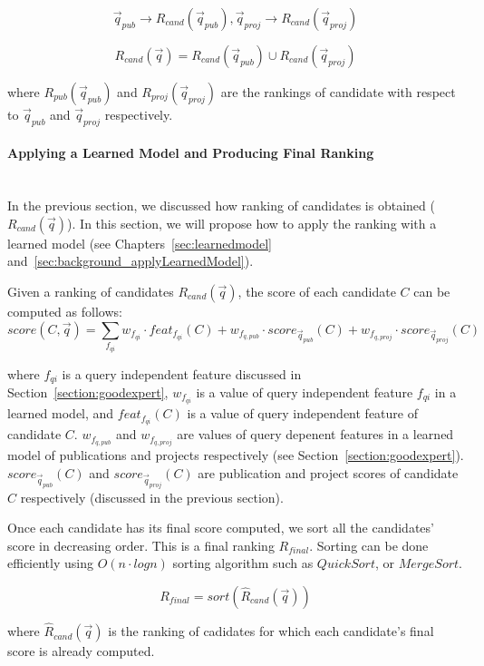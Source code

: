 \begin{equation}
 \vec{q}_{pub} \rightarrow R_{cand}(\vec{q}_{pub}),  \vec{q}_{proj} \rightarrow R_{cand}(\vec{q}_{proj})
\end{equation}

\begin{equation}
 R_{cand}(\vec{q}) = R_{cand}(\vec{q}_{pub})\cup R_{cand}(\vec{q}_{proj})
\end{equation}

where $R_{pub}(\vec{q}_{pub})$ and $R_{proj}(\vec{q}_{proj})$ are the rankings of candidate with respect to $\vec{q}_{pub}$ and $\vec{q}_{proj}$
respectively.

\paragraph{Applying a Learned Model and Producing Final Ranking} \hspace{0pt} \\
In the previous section, we discussed how ranking of candidates is obtained ($R_{cand}(\vec{q})$). In this section, we will propose how to apply the ranking
with a learned model (see Chapters~\ref{sec:learnedmodel} and~\ref{sec:background_applyLearnedModel}). 

Given a ranking of candidates $R_{cand}(\vec{q})$, the score of each candidate $C$ can be computed as follows:
\begin{equation}
 score(C, \vec{q}) = \sum_{f_{qi}} w_{f_{qi}}\cdot feat_{f_{qi}}(C) + w_{f_{q,pub}}\cdot score_{\vec{q}_{pub}}(C) + 
 w_{f_{q,proj}}\cdot score_{\vec{q}_{proj}}(C)
\end{equation}

where $f_{qi}$ is a query independent feature discussed in Section~\ref{section:goodexpert}, $w_{f_{qi}}$ is a value of 
query independent feature ${f_{qi}}$ in a learned model, and $feat_{f_{qi}}(C)$ is a value of query independent feature of candidate $C$.
$w_{f_{q,pub}}$ and $w_{f_{q,proj}}$ are values of query depenent features in a learned model of publications and projects respectively (see Section~\ref{section:goodexpert}).
$score_{\vec{q}_{pub}}(C)$ and $score_{\vec{q}_{proj}}(C)$ are publication and project scores of candidate $C$ respectively (discussed in the previous section).

Once each candidate has its final score computed, we sort all the candidates' score in decreasing order. This is a final ranking $R_{final}$. Sorting
can be done efficiently using $O(n\cdot log n)$ sorting algorithm such as $Quick Sort$, or $Merge Sort$.

\begin{equation}
 R_{final} = sort(\hat{R}_{cand}(\vec{q}))
\end{equation}

where $\hat{R}_{cand}(\vec{q})$ is the ranking of cadidates for which each candidate's final score is already computed.





